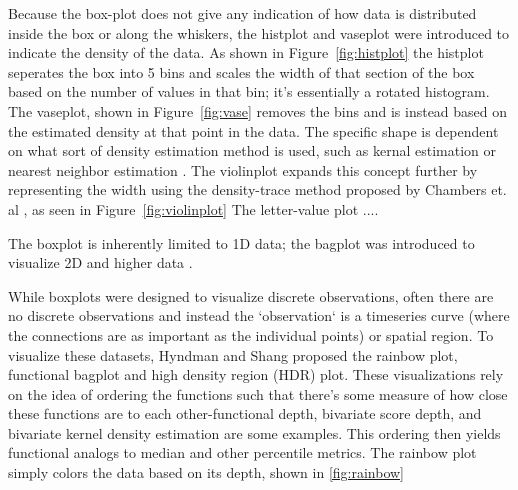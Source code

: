 \begin{figure}
\label{fig:histplot}
\label{fig:vase}
\label{fig:violin}
\end{figure}

Because the box-plot does not give any indication of how data is distributed
inside the box or along the whiskers, the histplot and vaseplot were introduced to indicate
the density of the data\cite{benjamini1988}. As shown in
Figure~\ref{fig:histplot} the histplot seperates the box
into  5 bins and scales the width of that section of the box based on the
number of values in that bin; it's essentially a rotated histogram. The
vaseplot, shown in Figure~\ref{fig:vase} removes the bins and is instead based
on the estimated density at that point in the data. The specific shape is
dependent on what sort of density estimation method is used, such as kernal
estimation or nearest neighbor estimation \cite{chambers1983}. The
violinplot \cite{hintz1998} expands this concept further by representing the
width using the density-trace method proposed by Chambers
et. al \cite{chambers1983}, as seen in Figure~\ref{fig:violinplot}%
The letter-value plot\cite{hofmann} ....



\begin{figure}
\end{figure}
The boxplot is inherently limited to 1D data; the bagplot was introduced to
visualize 2D and higher data \cite{roussow99}.

\begin{figure}
\end{figure}
While boxplots were designed to visualize discrete observations, often there
are no discrete observations and instead the `observation` is a timeseries
curve (where the connections are as important as the individual points) or
spatial region. To visualize these datasets, Hyndman and Shang proposed the
rainbow plot, functional bagplot and high density region (HDR)
plot\cite{Hyndman2009}. These visualizations rely on the idea of ordering the
functions such that there's some measure of how close these functions are to
each other-functional depth\cite{fabrero2007}, bivariate score depth, and
bivariate kernel density estimation\cite{scott92} are some examples. This
ordering then yields functional analogs to median and other percentile
metrics. The rainbow plot simply colors the data based on its depth, shown
in \ref{fig:rainbow}


